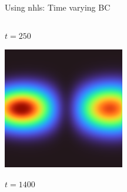 \begin{frame}{Using nhls: Time varying BC}
\begin{columns}
\begin{center}
  $t = 250$

  \vspace{0.5cm}

  \includegraphics[width=0.5\textwidth]{frame_0029.png}

  $t = 1400$ 
  \end{center}
\end{columns}
\end{frame}
\placelogotrue

